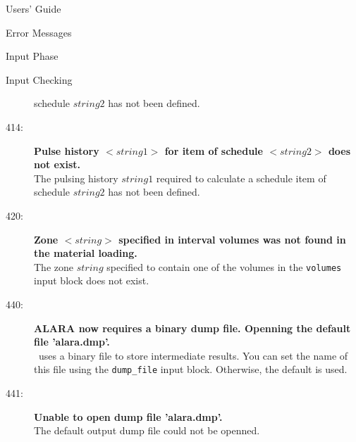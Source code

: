\begin{chapter}{Users' Guide\label{app:user.guide}}
\begin{section}{Error Messages}
\begin{subsection}{Input Phase}
\begin{subsubsection}{Input Checking}
\begin{description}
          schedule $string2$ has not been defined.
        \item[414:]\textbf{Pulse history $<\!\!string1\!\!>$ for
            item of schedule $<\!\!string2\!\!>$ does not exist.}\ \\
          The pulsing history $string1$ required to calculate a
          schedule item of schedule $string2$ has not been defined.
        \item[420:]\textbf{Zone $<\!\!string\!\!>$ specified in
            interval volumes was not found in the material loading.}\ 
          \\
          The zone $string$ specified to contain one of the volumes in
          the \texttt{volumes} input block does not exist.
        \item[440:]\textbf{ALARA now requires a binary dump file.
            Openning the default file 'alara.dmp'.}\ \\
          \ALARA\ uses a binary file to store intermediate results.
          You can set the name of this file using the
          \texttt{dump\_file} input block.  Otherwise, the default is
          used.
        \item[441:]\textbf{Unable to open dump file 'alara.dmp'.}\ \\
          The default output dump file could not be openned.
        \end{description}
      \end{subsubsection}
      

\end{subsection}
\end{section}
\end{chapter}
